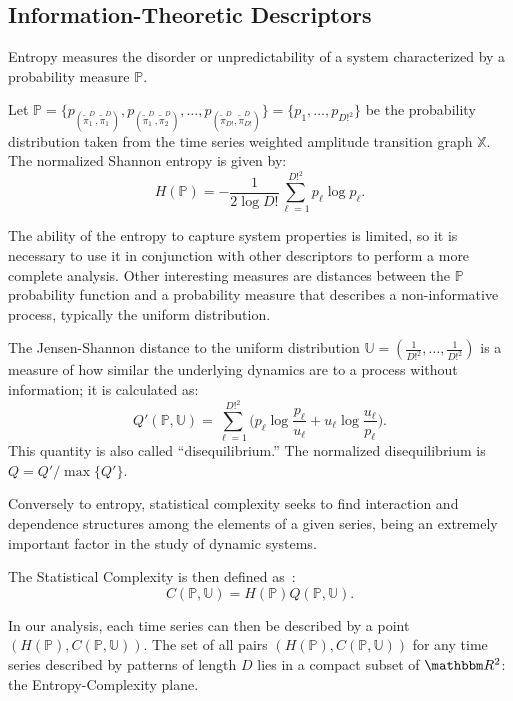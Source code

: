 \documentclass{isprs}
\begin{document}
	\subsection{Information-Theoretic Descriptors}\label{HC}
	
	Entropy measures the disorder or unpredictability of a system characterized by a probability measure $\mathbb{P}$.
	
	Let $\mathbb{P} = \{p_{(\widetilde\pi^D_1, \widetilde\pi^D_1)}, p_{(\widetilde\pi^D_1, \widetilde\pi^D_2)}, \dots, p_{(\widetilde\pi^D_{D!}, \widetilde\pi^D_{D!})} \} = \{p_1,\dots,p_{D!^2}\}$ be the probability distribution taken from the time series weighted amplitude transition graph $\mathbb{X}$.
	The normalized Shannon entropy is given by:	
	\begin{equation}
	H(\mathbb{P}) = -\frac1{2\log D!}\sum_{\ell=1}^{D!^2} p_{\ell} \log p_{\ell} .
	\label{eq:Entropia}
	\end{equation}
	
	The ability of the entropy to capture system properties is limited, so it is necessary to use it in conjunction with other des\-criptors to perform a more complete analysis.
	Other interesting measures are distances between the $\mathbb{P}$ probability function and a probability measure that describes a non-informative process, typically the uniform distribution.
	
	The Jensen-Shannon distance to the uniform distribution $\mathbb{U} = (\frac{1}{D!^2}, \dots, \frac{1}{D!^2})$ is a measure of how similar the underlying dynamics are to a process without information; it is calculated as:
	\begin{equation}
	Q'(\mathbb{P}, \mathbb{U}) = \sum_{\ell=1}^{D!^2} \Big(p_\ell \log\frac{p_\ell}{u_\ell} +
	u_\ell \log\frac{u_\ell}{p_\ell}
	\Big).
	\end{equation}
	This quantity is also called ``disequilibrium.''
	The normalized disequilibrium is $ Q=Q'/\max\{Q'\}$.
	
	Conversely to entropy, statistical complexity seeks to find interaction and dependence structures among the elements of a given series, being an extremely important factor in the study of dynamic systems.
	
	The Statistical Complexity is then defined as~\cite{Lamberti2004}:
	\begin{equation}
	C(\mathbb{P}, \mathbb{U}) = H(\mathbb{P}) Q(\mathbb{P}, \mathbb{U}).
	\end{equation}
	
	In our analysis, each time series can then be described by a point $(H(\mathbb{P}), C(\mathbb{P}, \mathbb{U}))$.
	The set of all pairs $(H(\mathbb{P}), C(\mathbb{P}, \mathbb{U}))$ for any time series described by patterns of length $D$ lies in a compact subset of $\mathbbm R^2$: the Entropy-Complexity plane. 
	
\end{document}
